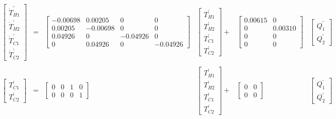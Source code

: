 \begin{equation}
	\label{eq:tclab_modelo_teorico}
	\begin{aligned}
		\begin{bmatrix}
			\dot{T}_{H1}^{'}	\\
			\dot{T}_{H2}^{'}	\\
			\dot{T}_{C1}^{'}	\\
			\dot{T}_{C2}^{'}
		\end{bmatrix}
		&=&
		\begin{bmatrix}
			-0.00698		&		0.00205		&		0			&		0		\\
			0.00205			&		-0.00698	&		0			&		0		\\
			0.04926			&		0			&		-0.04926	&		0		\\
				 0			&		0.04926		&		0			&		-0.04926	
		\end{bmatrix}
		&
		\begin{bmatrix}
			T_{H1}^{'}	\\
			T_{H2}^{'}	\\
			T_{C1}^{'}	\\
			T_{C2}^{'}
		\end{bmatrix}
		+&
		\begin{bmatrix}
			0.00615		&		0		\\
			0			&		0.00310	\\
			0			&		0		\\
			0			&		0	
		\end{bmatrix}
		&
		\begin{bmatrix}
			Q_{1}^{'}		\\
			Q_{2}^{'}
		\end{bmatrix}
		\\
		\\
		\begin{bmatrix}
			T_{C1}^{'}	\\
			T_{C2}^{'}
		\end{bmatrix}
		&=&
		\begin{bmatrix}
			0	&	0	&	1	&	0	\\
			0	&	0	&	0	&	1
		\end{bmatrix}
		&
		\begin{bmatrix}
			T_{H1}^{'}	\\
			T_{H2}^{'}	\\
			T_{C1}^{'}	\\
			T_{C2}^{'}
		\end{bmatrix}
		+&
		\begin{bmatrix}
			0	&	0	\\
			0	&	0
		\end{bmatrix}
		&
		\begin{bmatrix}
			Q_{1}^{'}		\\
			Q_{2}^{'}
		\end{bmatrix}
	\end{aligned}
\end{equation}
